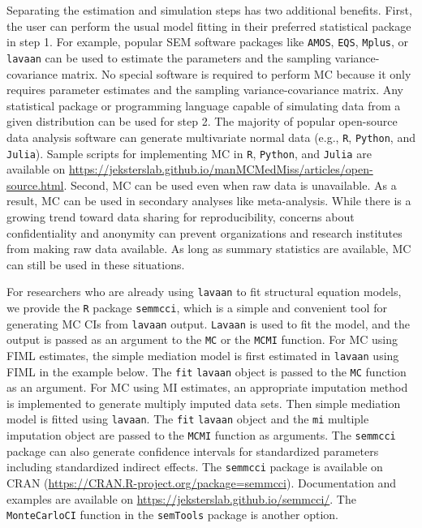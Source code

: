 \documentclass[man]{apa7}\usepackage[]{graphicx}\usepackage[]{xcolor}
\begin{document}
Separating the estimation and simulation steps has two additional benefits.
First,
the user can perform the usual model fitting in their preferred statistical package in step 1.
For example,
popular SEM software packages like 
\texttt{AMOS},
\texttt{EQS},
\texttt{Mplus},
or
\texttt{lavaan}
can be used to estimate the parameters
and the sampling variance-covariance matrix.
No special software is required to perform MC because it only requires parameter estimates and the sampling variance-covariance matrix.
Any statistical package or programming language capable of simulating data from a given distribution can be used for step 2.
The majority of popular open-source data analysis software can generate multivariate normal data 
(e.g.,
\texttt{R},
\texttt{Python},
and
\texttt{Julia}).
Sample scripts for implementing MC in
\texttt{R},
\texttt{Python},
and
\texttt{Julia}
are available on
\url{https://jeksterslab.github.io/manMCMedMiss/articles/open-source.html}. 
Second,
MC can be used even when raw data is unavailable.
As a result,
MC can be used in secondary analyses like meta-analysis.
While there is a growing trend toward data sharing for reproducibility,
concerns about confidentiality and anonymity can prevent organizations and research institutes from making raw data available.
As long as summary statistics are available,
MC can still be used in these situations.

For researchers who are already using \texttt{lavaan} to fit structural equation models,
we provide the \texttt{R} package \texttt{semmcci},
which is a simple and convenient tool for generating MC CIs from \texttt{lavaan} output.
\texttt{Lavaan} is used to fit the model,
and the output is passed as an argument to the \texttt{MC} or the \texttt{MCMI} function.
For MC using FIML estimates,
the simple mediation model is first estimated in \texttt{lavaan} using FIML in the example below.
The \texttt{fit} \texttt{lavaan} object is passed to the \texttt{MC} function as an argument.
For MC using MI estimates,
an appropriate imputation method is implemented to generate multiply imputed data sets.
Then simple mediation model is fitted using \texttt{lavaan}.
The \texttt{fit} \texttt{lavaan} object and the \texttt{mi} multiple imputation object
are passed to the \texttt{MCMI} function as arguments.
The \texttt{semmcci} package can also generate confidence intervals for standardized parameters including standardized indirect effects. The \texttt{semmcci} package is available on CRAN (\url{https://CRAN.R-project.org/package=semmcci}). 
Documentation and examples are available on \url{https://jeksterslab.github.io/semmcci/}.
The \texttt{MonteCarloCI} function in the \texttt{semTools}
\parencite{Lib-Structural-Equation-Modeling-Software-Manuals-Jorgensen-2022} package is another option.
\end{document}
